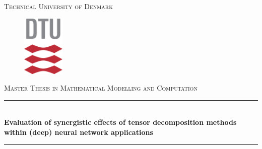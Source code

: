 \begin{titlepage}

\newcommand{\HRule}{\rule{\linewidth}{0.5mm}} %

\center %
 



\textsc{\LARGE Technical University of Denmark}\\[0.5cm] %

\begin{figure}[h]
\begin{center}
\includegraphics[width=2cm]{Pics/frontpage/dtu_logo.png}
\end{center}
\end{figure}

\textsc{\Large Master Thesis in Mathematical Modelling and Computation}\\[0.5cm] %


\HRule \\[0.4cm]
{ \huge \bfseries Evaluation of synergistic effects of tensor decomposition methods within (deep) neural network applications}\\[0.4cm] %
\HRule\\ [1cm]
 




\end{titlepage}

